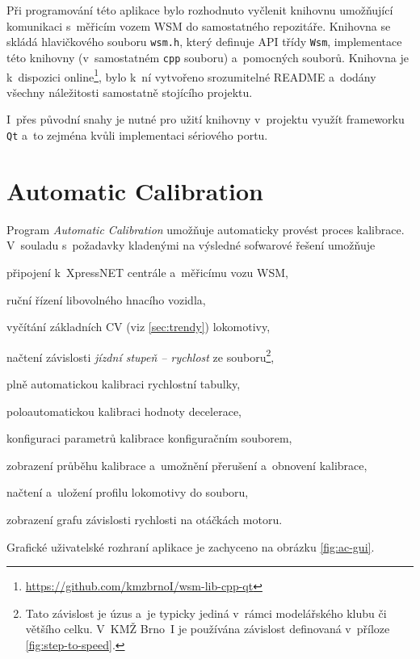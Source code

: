 Při programování této aplikace bylo rozhodnuto vyčlenit knihovnu umožňující
komunikaci s~měřicím vozem WSM do samostatného repozitáře. Knihovna se skládá
hlavičkového souboru \texttt{wsm.h}, který definuje API třídy \texttt{Wsm},
implementace této knihovny (v~samostatném \texttt{cpp} souboru) a~pomocných
souborů. Knihovna je k~dispozici
online\footnote{\url{https://github.com/kmzbrnoI/wsm-lib-cpp-qt}}, bylo k~ní
vytvořeno srozumitelné README a~dodány všechny náležitosti samostatně stojícího
projektu.

I~přes původní snahy je nutné pro užití knihovny v~projektu využít frameworku
\texttt{Qt} a~to zejména kvůli implementaci sériového portu.


\newpage
\section{Automatic Calibration}
\label{sec:sw-wsm-auto-calib}

Program \textit{Automatic Calibration} umožňuje automaticky provést proces
kalibrace. V~souladu s~požadavky kladenými na výsledné sofwarové řešení
umožňuje

\begin{compactitem}
\item připojení k~XpressNET centrále a~měřicímu vozu WSM,
\item ruční řízení libovolného hnacího vozidla,
\item vyčítání základních CV (viz \ref{sec:trendy}) lokomotivy,
\item načtení závislosti \textit{jízdní stupeň -- rychlost} ze
souboru\footnote{Tato závislost je úzus a~je typicky jediná v~rámci
modelářského klubu či většího celku. V~KMŽ Brno~I je používána závislost
definovaná v~příloze \ref{fig:step-to-speed}.},
\item plně automatickou kalibraci rychlostní tabulky,
\item poloautomatickou kalibraci hodnoty decelerace,
\item konfiguraci parametrů kalibrace konfiguračním souborem,
\item zobrazení průběhu kalibrace a~umožnění přerušení a~obnovení kalibrace,
\item načtení a~uložení profilu lokomotivy do souboru,
\item zobrazení grafu závislosti rychlosti na otáčkách motoru.
\end{compactitem}

Grafické uživatelské rozhraní aplikace je zachyceno na obrázku \ref{fig:ac-gui}.

